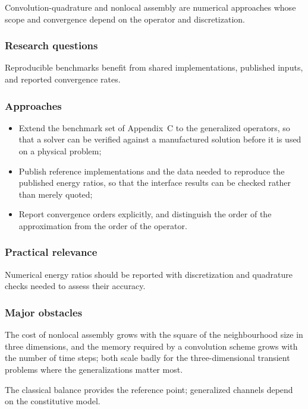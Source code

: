 Convolution-quadrature and nonlocal assembly are numerical approaches whose scope and convergence depend on the operator and discretization.

\subsubsection{Research questions}

Reproducible benchmarks benefit from shared implementations, published inputs, and reported convergence rates.

\subsubsection{Approaches}

\begin{itemize}
\item Extend the benchmark set of Appendix~C to the generalized operators, so that a solver can be verified against a manufactured solution before it is used on a physical problem;
\item Publish reference implementations and the data needed to reproduce the published energy ratios, so that the interface results can be checked rather than merely quoted;
\item Report convergence orders explicitly, and distinguish the order of the approximation from the order of the operator.
\end{itemize}

\subsubsection{Practical relevance}

Numerical energy ratios should be reported with discretization and quadrature checks needed to assess their accuracy.

\subsubsection{Major obstacles}

The cost of nonlocal assembly grows with the square of the neighbourhood size in three dimensions, and the memory required by a convolution scheme grows with the number of time steps; both scale badly for the three-dimensional transient problems where the generalizations matter most.

The classical balance provides the reference point; generalized channels depend on the constitutive model.

